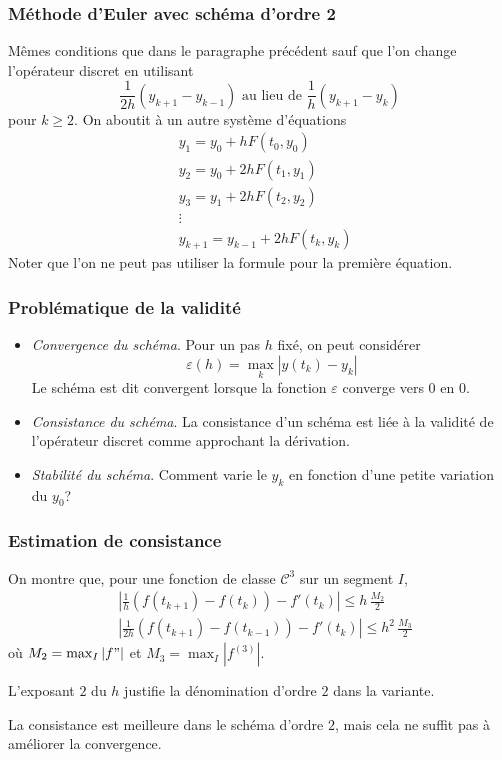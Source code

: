 \begin{frame}
  \frametitle{Méthode d'Euler avec schéma d'ordre 2}
Mêmes conditions que dans le paragraphe précédent sauf que l'on change l'opérateur discret en utilisant 
\begin{displaymath}
\frac{1}{2h}(y_{k+1}-y_{k-1}) \text{ au lieu de } \frac{1}{h}(y_{k+1}-y_{k})
\end{displaymath}
pour $k\geq 2$. On aboutit à un autre système d'équations
\begin{align*}
  &y_1 = y_0 + hF(t_0,y_0) \\ &y_2 = y_0 + 2hF(t_1,y_1)\\ &y_3 = y_1 + 2hF(t_2,y_2)\\ &\vdots \\ &y_{k+1} = y_{k-1} + 2hF(t_k,y_k)
\end{align*}
Noter que l'on ne peut pas utiliser la formule pour la première équation.
\end{frame}

\begin{frame}
  \frametitle{Problématique de la validité}
\begin{itemize}
  \item \emph{Convergence du schéma}. Pour un pas $h$ fixé, on peut considérer
\begin{displaymath}
  \varepsilon(h)=\max_{k}|y(t_k) - y_k|
\end{displaymath}
Le schéma est dit convergent lorsque la fonction $\varepsilon$ converge vers $0$ en $0$.
  \item \emph{Consistance du schéma}. La consistance d'un schéma est liée à la validité de l'opérateur discret comme approchant la dérivation.
  \item \emph{Stabilité du schéma}. Comment varie le $y_k$ en fonction d'une petite variation du $y_0$?
\end{itemize}
\end{frame}

\begin{frame}
  \frametitle{Estimation de consistance}
On montre que, pour une fonction de classe $\mathcal{C}^3$ sur un segment $I$,
\begin{align*}
  &\left|\frac{1}{h}\left( f(t_{k+1})-f(t_k)\right) -f'(t_k) \right|\leq h\,\frac{M_2}{2} \\
  &\left|\frac{1}{2h}\left( f(t_{k+1})-f(t_{k-1})\right) -f'(t_k) \right|\leq h^2\,\frac{M_3}{2}
\end{align*}
où $M_2 = \max_{I}|f"|$ et $M_3 = \max_{I}|f^{(3)}|$.

L'exposant $2$ du $h$ justifie la dénomination d'ordre $2$ dans la variante.

La consistance est meilleure dans le schéma d'ordre $2$, mais cela ne suffit pas à améliorer la convergence.
\end{frame}

